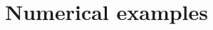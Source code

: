 \documentclass[twocolumn]{autart}
\begin{document}
\section{Numerical examples} \label{Sec:Exmple}
%
\end{document}
